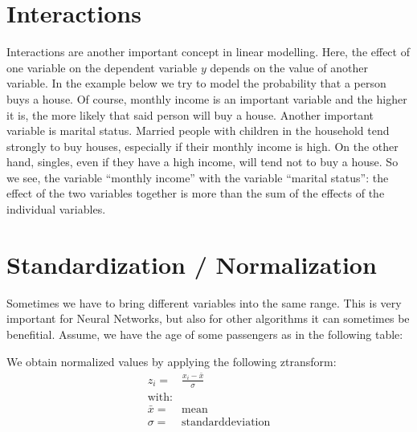 \documentclass[letterpaper,10pt,english]{jupyterBook}
\begin{document}
\section{Interactions}
\label{\detokenize{Data_Basics:interactions}}
\sphinxAtStartPar
Interactions are another important concept in linear modelling. Here, the effect of one variable on the dependent variable \(y\) depends on the value of another variable.
In the example below we try to model the probability that a person buys a house. Of course, monthly income is an important variable and the higher it is, the more likely that said person will buy a house. Another important variable is marital status. Married people with children in the household tend strongly to buy houses, especially if their monthly income is high. On the other hand, singles, even if they have a high income, will tend not to buy a house.
So we see, the variable “monthly income”  with the variable “marital status”: the effect of the two variables together is more than the sum of the effects of the individual variables.

\noindent{}


\section{Standardization / Normalization}
\label{\detokenize{Data_Basics:standardization-normalization}}
\sphinxAtStartPar
Sometimes we have to bring different variables into the same range. This is very important for Neural Networks, but also for other algorithms it can sometimes be benefitial. 
Assume, we have the age of some passengers as in the following table:

\sphinxAtStartPar
We obtain normalized values by applying the following z\sphinxhyphen{}transform:
\label{equation:Data_Basics:35cbd6a8-a81e-4c16-8ab9-792e4d5bcdd9}\begin{eqnarray}
z_i=&\frac{x_i - \bar{x}}{\sigma}\\
\text{with:}&\\
\bar{x}=&\text{mean}\\
\sigma=&\text{standarddeviation}
\end{eqnarray}
\begin{sphinxVerbatim}[commandchars=\\\{\}]
\PYG{p}{[}\PYG{p}{]}  \PYG{p}{[}\PYG{p}{]}  \PYG{p}{[}\PYG{p}{]}\PYG{p}{[}\PYG{p}{]}
\end{sphinxVerbatim}
\end{document}
